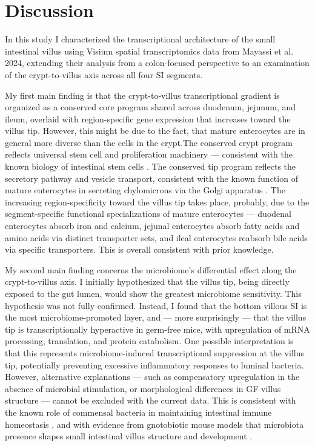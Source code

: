 \documentclass[11pt, a4paper]{article}
\begin{document}
\section{Discussion}

In this study I characterized the transcriptional architecture of 
the small intestinal villus using Visium spatial transcriptomics 
data from Mayassi et al. 2024, extending their analysis from a 
colon-focused perspective to an examination of the 
crypt-to-villus axis across all four SI segments.

My first main finding is that the crypt-to-villus transcriptional 
gradient is organized as a conserved core program shared across 
duodenum, jejunum, and ileum, overlaid with region-specific gene 
expression that increases toward the villus tip. However, this might 
be due to the fact, that mature enterocytes are in general more diverse 
than the cells in the crypt.The conserved 
crypt program reflects universal stem cell and proliferation 
machinery — consistent with the known biology of intestinal 
stem cells \cite{gehart2019tales}. The conserved 
tip program reflects the secretory pathway and vesicle transport, consistent 
with the known function of mature enterocytes in secreting 
chylomicrons via the Golgi apparatus \cite{abumrad2012intestinal}. 
The increasing region-specificity toward the villus tip takes place, 
probably, due to the segment-specific functional specializations of mature 
enterocytes — duodenal enterocytes absorb iron and calcium, 
jejunal enterocytes absorb fatty acids and amino acids via 
distinct transporter sets, and ileal enterocytes reabsorb 
bile acids via specific transporters. This is overall consistent with 
prior knowledge.

My second main finding concerns the microbiome's differential effect 
along the crypt-to-villus axis. I initially hypothesized that the 
villus tip, being directly exposed to the gut lumen, would show the 
greatest microbiome sensitivity. This hypothesis was not fully confirmed. 
Instead, I found that the bottom villous SI is the most 
microbiome-promoted layer, and — more surprisingly — that the villus 
tip is transcriptionally hyperactive in germ-free mice, with 
upregulation of mRNA processing, translation, and protein catabolism. 
One possible interpretation is that this represents microbiome-induced 
transcriptional suppression at the villus tip, potentially preventing 
excessive inflammatory responses to luminal bacteria. However, 
alternative explanations — such as compensatory upregulation in the 
absence of microbial stimulation, or morphological differences in 
GF villus structure — cannot be excluded with the current data. 
This is consistent with the known role of commensal bacteria in 
maintaining intestinal immune homeostasis \cite{hooper2012interactions},
and with evidence from gnotobiotic mouse models that microbiota 
presence shapes small intestinal villus structure and development 
\cite{paeslack2024impact}.
\end{document}
